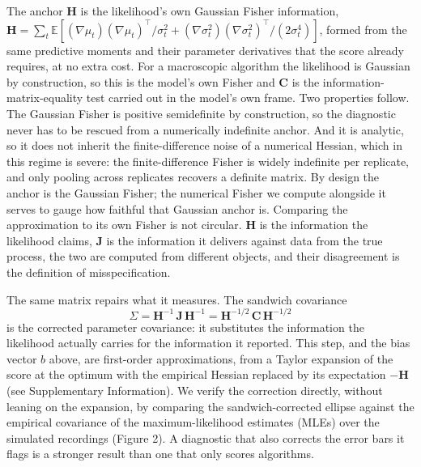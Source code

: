 The anchor $\mathbf{H}$ is the likelihood's own Gaussian Fisher information, $\mathbf{H}=\sum_t\mathbb{E}\!\left[(\nabla\mu_t)(\nabla\mu_t)^\top/\sigma_t^2+(\nabla\sigma_t^2)(\nabla\sigma_t^2)^\top/(2\sigma_t^4)\right]$, formed from the same predictive moments and their parameter derivatives that the score already requires, at no extra cost. For a macroscopic algorithm the likelihood is Gaussian by construction, so this is the model's own Fisher and $\mathbf{C}$ is the information-matrix-equality test carried out in the model's own frame. Two properties follow. The Gaussian Fisher is positive semidefinite by construction, so the diagnostic never has to be rescued from a numerically indefinite anchor. And it is analytic, so it does not inherit the finite-difference noise of a numerical Hessian, which in this regime is severe: the finite-difference Fisher is widely indefinite per replicate, and only pooling across replicates recovers a definite matrix. By design the anchor is the Gaussian Fisher; the numerical Fisher we compute alongside it serves to gauge how faithful that Gaussian anchor is. Comparing the approximation to its own Fisher is not circular. $\mathbf{H}$ is the information the likelihood claims, $\mathbf{J}$ is the information it delivers against data from the true process, the two are computed from different objects, and their disagreement is the definition of misspecification.

The same matrix repairs what it measures. The sandwich covariance
\[ \Sigma=\mathbf{H}^{-1}\,\mathbf{J}\,\mathbf{H}^{-1}=\mathbf{H}^{-1/2}\,\mathbf{C}\,\mathbf{H}^{-1/2} \]
is the corrected parameter covariance: it substitutes the information the likelihood actually carries for the information it reported. This step, and the bias vector $b$ above, are first-order approximations, from a Taylor expansion of the score at the optimum with the empirical Hessian replaced by its expectation $-\mathbf{H}$ (see Supplementary Information). We verify the correction directly, without leaning on the expansion, by comparing the sandwich-corrected ellipse against the empirical covariance of the maximum-likelihood estimates (MLEs) over the simulated recordings (Figure 2). A diagnostic that also corrects the error bars it flags is a stronger result than one that only scores algorithms.


